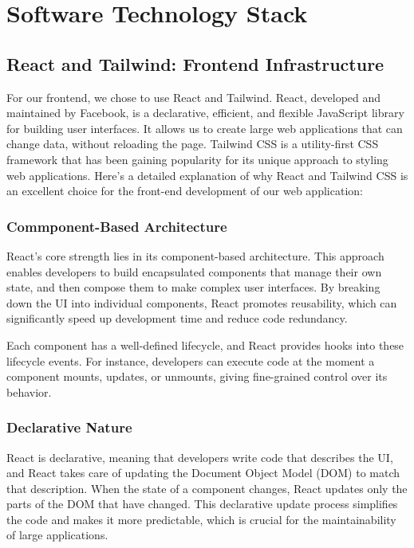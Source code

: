 \section{Software Technology Stack}
\label{sec:technology}

\subsection{React and Tailwind: Frontend Infrastructure}
For our frontend, we chose to use React and Tailwind. React, developed and maintained by Facebook, is a declarative, efficient, and flexible JavaScript library for building user interfaces. 
It allows us to create large web applications that can change data, without reloading the page. 
Tailwind CSS is a utility-first CSS framework that has been gaining popularity for its unique approach to styling web applications. 
Here's a detailed explanation of why React and Tailwind CSS is an excellent choice for the front-end development of our web application:

\subsubsection{Commponent-Based Architecture }

React's core strength lies in its component-based architecture. This approach enables developers to build encapsulated components that manage their own state, and then compose them to make complex user interfaces. 
By breaking down the UI into individual components, React promotes reusability, which can significantly speed up development time and reduce code redundancy.

Each component has a well-defined lifecycle, and React provides hooks into these lifecycle events. 
For instance, developers can execute code at the moment a component mounts, updates, or unmounts, giving fine-grained control over its behavior.

\subsubsection{Declarative Nature} 

React is declarative, meaning that developers write code that describes the UI, and React takes care of updating the Document Object Model (DOM) to match that description. 
When the state of a component changes, React updates only the parts of the DOM that have changed. 
This declarative update process simplifies the code and makes it more predictable, which is crucial for the maintainability of large applications.


